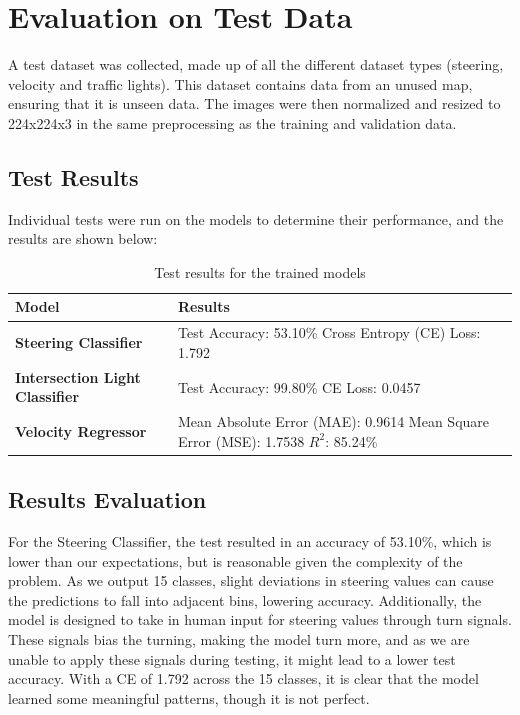 \documentclass{article} %
\begin{document}
\section{Evaluation on Test Data}
A test dataset was collected, made up of all the different dataset types (steering, velocity and traffic lights). 
This dataset contains data from an unused map, ensuring that it is unseen data.
The images were then normalized and resized to 224x224x3 in the same preprocessing as the training and validation data.

\subsection{Test Results}
Individual tests were run on the models to determine their performance, and the results are shown below:

\begin{table}[h]
\centering
\caption{Test results for the trained models}
\vspace{0.5em}
\begin{tabular}{|p{4cm}|p{9cm}|}
\hline
\textbf{Model} & \textbf{Results} \\ \hline
\textbf{Steering Classifier} & 
Test Accuracy: 53.10\% \newline
Cross Entropy (CE) Loss: 1.792 \\ \hline
\textbf{Intersection Light Classifier} & 
Test Accuracy: 99.80\% \newline
CE Loss: 0.0457 \\ \hline
\textbf{Velocity Regressor} & 
Mean Absolute Error (MAE): 0.9614 \newline
Mean Square Error (MSE): 1.7538 \newline
$R^2$: 85.24\% \\ \hline
\end{tabular}
\end{table}


\subsection{Results Evaluation}
For the Steering Classifier, the test resulted in an accuracy of 53.10\%, 
which is lower than our expectations, but is reasonable given the complexity of the problem. As we output 15 classes, 
slight deviations in steering values can cause the predictions to fall into adjacent bins, lowering accuracy. 
Additionally, the model is designed to take in human input for steering values through turn signals. 
These signals bias the turning, making the model turn more, and as we are unable to apply these signals during testing, 
it might lead to a lower test accuracy. With a CE of 1.792 across the 15 classes, it is clear that the model learned some meaningful patterns, 
though it is not perfect.
\end{document}
